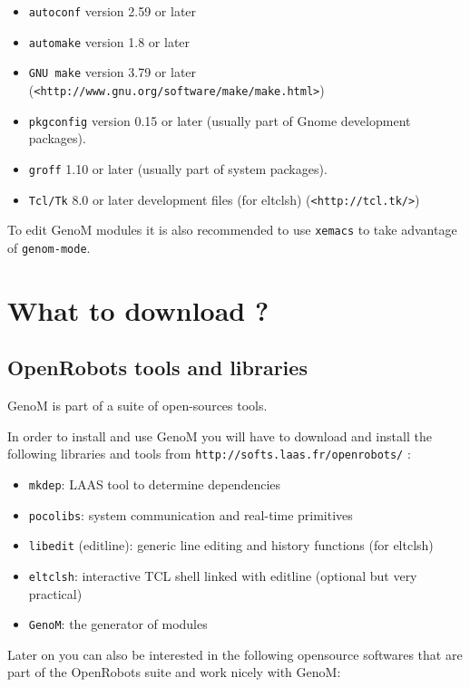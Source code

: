 \begin{itemize}
\item \texttt{autoconf} version 2.59 or later
\item \texttt{automake} version 1.8 or later
\item \texttt{GNU make} version 3.79 or later  (\texttt{<http://www.gnu.org/software/make/make.html>})
\item \texttt{pkgconfig} version 0.15 or later (usually part of Gnome development packages).
\item \texttt{groff} 1.10 or later (usually part of system packages).
\item \texttt{Tcl/Tk} 8.0 or later development files (for eltclsh) (\texttt{<http://tcl.tk/>})
\end{itemize}

To edit GenoM modules it is also recommended to use \texttt{xemacs} to take
advantage of \texttt{genom-mode}.

\section{What to download ?}
\label{sec|configuration|download}

\subsection{OpenRobots tools and libraries}

GenoM is part of a suite of open-sources tools. 

In order to install and use GenoM you will have to download and install
the following libraries and tools from  
\texttt{http://softs.laas.fr/openrobots/} :

\begin{itemize}
\item \texttt{mkdep}: LAAS tool to determine dependencies
\item \texttt{pocolibs}: system communication and real-time primitives
\item \texttt{libedit} (editline): generic line editing and history
functions (for eltclsh)
\item \texttt{eltclsh}: interactive TCL shell linked with editline (optional but very practical)
\item \texttt{GenoM}: the generator of modules
\end{itemize}

Later on you can also be interested in the following opensource softwares
that are part of the OpenRobots suite and work nicely with GenoM:

